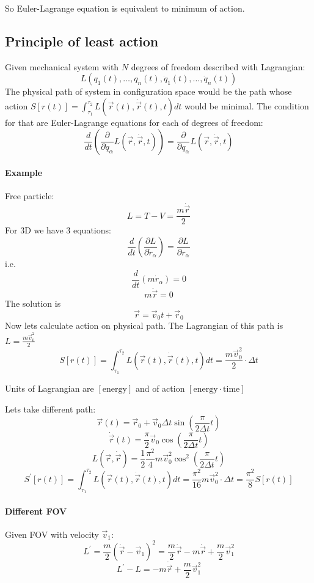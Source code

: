 So Euler-Lagrange equation is equivalent to minimum of action.
\subsection{Principle of least action}
Given mechanical system with $N$ degrees of freedom described with Lagrangian:
$$L\left(q_1(t), \dots, q_n(t), \dot{q}_1(t), \dots, \dot{q}_n(t)\right)$$
The physical path of system in configuration space would be the path whose action 
$S\left[r(t)\right] = \int_{\tau_1}^{\tau_2} L(\vec{r}(t), \dot{\vec{r}}(t),t) dt$
would be minimal. The condition for that are Euler-Lagrange equations for each of degrees of freedom:
$$\frac{d}{dt}\left( \frac{\partial}{\partial \dot{q}_\alpha} L(\vec{r}, \dot{\vec{r}}, t) \right) = \frac{\partial}{\partial q_\alpha} L(\vec{r}, \dot{\vec{r}}, t) $$

\paragraph{Example}
Free particle:
$$L = T - V = \frac{m\dot{\vec{r}}}{2}$$
For 3D we have 3 equations:
$$\frac{d}{dt} \left( \frac{\partial L}{\partial \dot{r}_\alpha} \right) = \frac{\partial L}{\partial r_\alpha} $$
i.e.
$$\frac{d}{dt} \left( m\dot{r}_\alpha \right) = 0$$
$$m\ddot{\vec{r}} = 0$$
The solution is
$$\vec{r} = \vec{v}_0t+\vec{r}_0$$
Now lets calculate action on physical path. The Lagrangian of this path is $L = \frac{m\vec{v}_0^2}{2}$
$$ S\left[r(t)\right] = \int_{\tau_1}^{\tau_2} L(\vec{r}(t), \dot{\vec{r}}(t),t) dt = \frac{m\vec{v}_0^2}{2} \cdot \Delta t $$

Units of Lagrangian are $\left[\text{energy}\right]$ and of action $\left[\text{energy}\cdot \text{time} \right]$ 

Lets take different path:
$$\vec{r}(t) = \vec{r}_0 + \vec{v}_0 \Delta t \sin \left( \frac{\pi}{2\Delta t} t \right)$$
$$\dot{\vec{r}}(t) =\frac{\pi}{2} \vec{v}_0  \cos \left( \frac{\pi}{2\Delta t} t \right)$$
$$L(\vec{r}, \dot{\vec{r}}) = \frac{1}{2} \frac{\pi^2}{4}m \vec{v}_0^2  \cos^2 \left( \frac{\pi}{2\Delta t} t \right)$$
$$ S^\prime \left[r(t)\right] = \int_{\tau_1}^{\tau_2} L(\vec{r}(t), \dot{\vec{r}}(t),t) dt = \frac{\pi^2}{16} m\vec{v}_0^2  \cdot \Delta t  = \frac{\pi^2}{8}S\left[r(t)\right]$$

\paragraph{Different FOV}
Given FOV with velocity $\vec{v}_1$:
$$L^\prime = \frac{m}{2} \left( \dot{\vec{r}} - \vec{v}_1 \right)^2  = \frac{m}{2}\dot{\vec{r}} - m\dot{\vec{r}} + \frac{m}{2}\vec{v}_1^2$$
$$L^\prime  -L = - m\dot{\vec{r}} + \frac{m}{2}\vec{v}_1^2 $$

